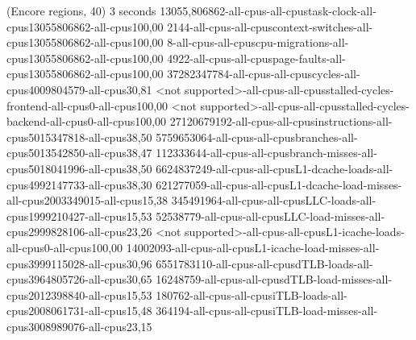(Encore regions, 40)
3 seconds
13055,806862-all-cpus-all-cpustask-clock-all-cpus13055806862-all-cpus100,00
2144-all-cpus-all-cpuscontext-switches-all-cpus13055806862-all-cpus100,00
8-all-cpus-all-cpuscpu-migrations-all-cpus13055806862-all-cpus100,00
4922-all-cpus-all-cpuspage-faults-all-cpus13055806862-all-cpus100,00
37282347784-all-cpus-all-cpuscycles-all-cpus4009804579-all-cpus30,81
<not supported>-all-cpus-all-cpusstalled-cycles-frontend-all-cpus0-all-cpus100,00
<not supported>-all-cpus-all-cpusstalled-cycles-backend-all-cpus0-all-cpus100,00
27120679192-all-cpus-all-cpusinstructions-all-cpus5015347818-all-cpus38,50
5759653064-all-cpus-all-cpusbranches-all-cpus5013542850-all-cpus38,47
112333644-all-cpus-all-cpusbranch-misses-all-cpus5018041996-all-cpus38,50
6624837249-all-cpus-all-cpusL1-dcache-loads-all-cpus4992147733-all-cpus38,30
621277059-all-cpus-all-cpusL1-dcache-load-misses-all-cpus2003349015-all-cpus15,38
345491964-all-cpus-all-cpusLLC-loads-all-cpus1999210427-all-cpus15,53
52538779-all-cpus-all-cpusLLC-load-misses-all-cpus2999828106-all-cpus23,26
<not supported>-all-cpus-all-cpusL1-icache-loads-all-cpus0-all-cpus100,00
14002093-all-cpus-all-cpusL1-icache-load-misses-all-cpus3999115028-all-cpus30,96
6551783110-all-cpus-all-cpusdTLB-loads-all-cpus3964805726-all-cpus30,65
16248759-all-cpus-all-cpusdTLB-load-misses-all-cpus2012398840-all-cpus15,53
180762-all-cpus-all-cpusiTLB-loads-all-cpus2008061731-all-cpus15,48
364194-all-cpus-all-cpusiTLB-load-misses-all-cpus3008989076-all-cpus23,15
